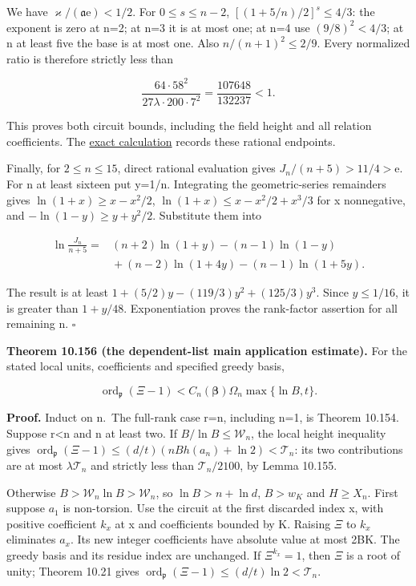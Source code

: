 \documentclass[
  11pt,
  a4paper,
]{article}
\begin{document}
We have \(\varkappa/(\mathfrak a\mathrm e)<1/2\). For \(0\le s\le n-2\),
\([(1+5/n)/2]^s\le4/3\): the exponent is zero at n=2; at n=3 it is at
most one; at n=4 use \((9/8)^2<4/3\); at n at least five the base is at
most one. Also \(n/(n+1)^2\le2/9\). Every normalized ratio is therefore
strictly less than

\[
\frac{64\cdot58^2}{27\lambda\cdot200\cdot7^2}
=\frac{107648}{132237}<1.
\tag{10.482}
\]

This proves both circuit bounds, including the field height and all
relation coefficients. The
\href{../figure_sources/yu_dependent_application_enclosures.py}{exact
calculation} records these rational endpoints.

Finally, for \(2\le n\le15\), direct rational evaluation gives
\(J_n/(n+5)>11/4>\mathrm e\). For n at least sixteen put y=1/n.
Integrating the geometric-series remainders gives
\(\ln(1+x)\ge x-x^2/2\), \(\ln(1+x)\le x-x^2/2+x^3/3\) for x
nonnegative, and \(-\ln(1-y)\ge y+y^2/2\). Substitute them into

\[
\begin{aligned}
\ln\frac{J_n}{n+5}={}&(n+2)\ln(1+y)-(n-1)\ln(1-y)\\
&{}+(n-2)\ln(1+4y)-(n-1)\ln(1+5y).
\end{aligned}
\tag{10.483}
\]

The result is at least \(1+(5/2)y-(119/3)y^2+(125/3)y^3\). Since
\(y\le1/16\), it is greater than \(1+y/48\). Exponentiation proves the
rank-factor assertion for all remaining n. \(\square\)

\textbf{Theorem 10.156 (the dependent-list main application estimate).}
For the stated local units, coefficients and specified greedy basis,

\[
\operatorname{ord}_{\mathfrak p}(\Xi-1)
<C_n(\boldsymbol\beta)\Omega_n\max\{\ln B,t\}.
\tag{10.484}
\]

\textbf{Proof.} Induct on n.~The full-rank case r=n, including n=1, is
Theorem 10.154. Suppose r\textless n and n at least two. If
\(B/\ln B\le\mathcal W_n\), the local height inequality gives
\(\operatorname{ord}_{\mathfrak p}(\Xi-1)
\le(d/t)(nBh(a_n)+\ln2)<\mathcal T_n\): its two contributions are at
most \(\lambda\mathcal T_n\) and strictly less than
\(\mathcal T_n/2100\), by Lemma 10.155.

Otherwise \(B>\mathcal W_n\ln B>\mathcal W_n\), so \(\ln B>n+\ln d\),
\(B>w_K\) and \(H\ge X_n\). First suppose \(a_1\) is non-torsion. Use
the circuit at the first discarded index x, with positive coefficient
\(k_x\) at x and coefficients bounded by K. Raising \(\Xi\) to \(k_x\)
eliminates \(a_x\). Its new integer coefficients have absolute value at
most 2BK. The greedy basis and its residue index are unchanged. If
\(\Xi^{k_x}=1\), then \(\Xi\) is a root of unity; Theorem 10.21 gives
\(\operatorname{ord}_{\mathfrak p}(\Xi-1)\le(d/t)\ln2<\mathcal T_n\).
\end{document}
